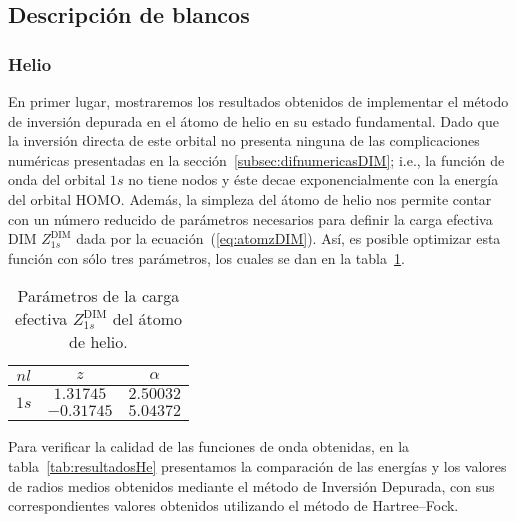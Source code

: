 \subsection{Descripción de blancos}
\label{subsec:dimtarget}

\subsubsection*{Helio}

En primer lugar, mostraremos los resultados obtenidos de implementar
el método de inversión depurada en el átomo de helio en su estado
fundamental. Dado que la inversión directa de este orbital no presenta 
ninguna de las complicaciones numéricas presentadas en la
sección~\ref{subsec:difnumericasDIM}; i.e., la función de onda del 
orbital $1s$ no tiene nodos y éste decae exponencialmente con la energía 
del orbital HOMO. Además, la simpleza del átomo de helio nos permite contar 
con un número reducido de parámetros necesarios para definir la carga 
efectiva DIM $Z_{1s}^{\mathrm{ DIM}}$ dada por la 
ecuación~(\ref{eq:atomzDIM}). Así, es posible optimizar esta función 
con sólo tres parámetros, los cuales se dan en la tabla~\ref{tab:parametrosHe}.

\begin{table}
\begin{center}
\begin{tabular}{|c|c|c|}
\hline
  $nl$ & $z$ & $\alpha$ \\
\hline
\hline
\multirow{2}{*}{$1s$} &  $1.31745$ & $2.50032$ \\
                      & $-0.31745$ & $5.04372$ \\
\hline
\end{tabular}
\caption[Parámetros de la carga efectiva del helio.]
{Parámetros de la carga efectiva $Z_{1s}^{\mathrm{ DIM}}$ del átomo de 
helio.}
\label{tab:parametrosHe}
\end{center}
\end{table}

Para verificar la calidad de las funciones de onda obtenidas, en la 
tabla~\ref{tab:resultadosHe} presentamos la comparación de las energías 
y los valores de radios medios obtenidos mediante el método de Inversión
Depurada, con sus correspondientes valores obtenidos utilizando el 
método de Hartree--Fock.

